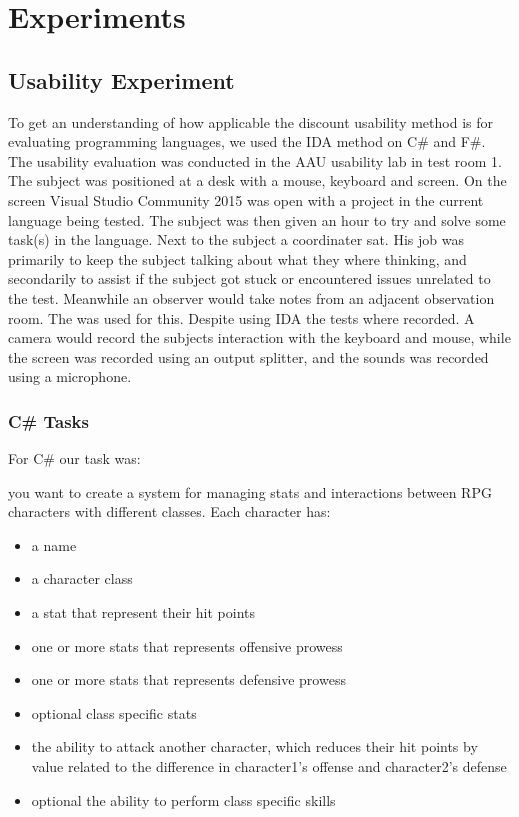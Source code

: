 \chapter{Experiments}
\section{Usability Experiment}
To get an understanding of how applicable the discount usability method is for evaluating programming languages, we used the IDA method on C\# and F\#.
The usability evaluation was conducted in the AAU usability lab  in test room 1.
The subject was positioned at a desk with a mouse, keyboard and screen.
On the screen Visual Studio Community 2015 was open with a project in the current language being tested.
The subject was then given an hour to try and solve some task(s) in the language.
Next to the subject a coordinater sat.
His job was primarily to keep the subject talking about what they where thinking, and secondarily to assist if the subject got stuck or encountered issues unrelated to the test.
Meanwhile an observer would take notes from an adjacent observation room.
The  was used for this.
Despite using IDA the tests where recorded.
A camera would record the subjects interaction with the keyboard and mouse, while the screen was recorded using an output splitter, and the sounds was recorded using a microphone.

\subsection{C\# Tasks}
For C\# our task was:

you want to create a system for managing stats and interactions between RPG characters with different classes.
Each character has:
\begin{itemize}
\item a name
\item a character class
\item a stat that represent their hit points
\item one or more stats that represents offensive prowess
\item one or more stats that represents defensive prowess
\item optional class specific stats
\item the ability to attack another character, which reduces their hit points by value related to the difference in character1's offense and character2's defense
\item optional the ability to perform class specific skills
\end{itemize}

